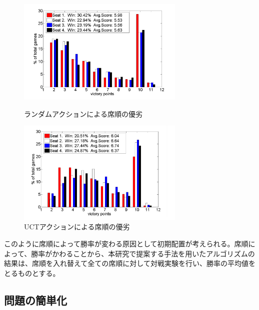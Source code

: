 \documentclass[a4, 10pt,dvipdfmx]{jsarticle}
\begin{document}
\begin{figure}[t]
 \begin{minipage}{0.5\hsize}
    \begin{center}
      \includegraphics[width=80mm]{img/smart_random.png}
    \end{center}
    \caption{ランダムアクションによる席順の優劣\cite{SmartSettlers}}
    \label{smart_random}
 \end{minipage}
 \begin{minipage}{0.5\hsize}
    \begin{center}
      \includegraphics[width=80mm]{img/smart_uct.png}
    \end{center}
    \caption{UCTアクションによる席順の優劣\cite{SmartSettlers}}
    \label{smart_uct}
 \end{minipage}
\end{figure}

このように席順によって勝率が変わる原因として初期配置が考えられる\cite{SmartSettlers}。席順によって、勝率がかわることから、本研究で提案する手法を用いたアルゴリズムの結果は、席順を入れ替えて全ての席順に対して対戦実験を行い、勝率の平均値をとるものとする。



\subsection{問題の簡単化}
\end{document}
